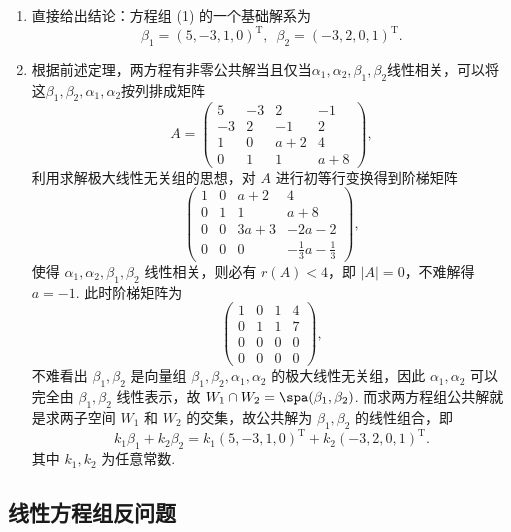 \begin{solution}
    \begin{enumerate}
        \item 直接给出结论：方程组 (1) 的一个基础解系为
              \[\beta_1=(5,-3,1,0)^{\mathrm{T}},\enspace\beta_2=(-3,2,0,1)^{\mathrm{T}}.\]

        \item 根据前述定理，两方程有非零公共解当且仅当$\alpha_1,\alpha_2,\beta_1,\beta_2$线性相关，可以将这$\beta_1,\beta_2,\alpha_1,\alpha_2$按列排成矩阵
              \[A = \begin{pmatrix}
                      5 & -3 & 2 & -1 \\ -3 & 2 & -1 & 2 \\ 1 & 0 & a+2 & 4 \\ 0 & 1 & 1 & a+8
                  \end{pmatrix},\]
              利用求解极大线性无关组的思想，对 $A$ 进行初等行变换得到阶梯矩阵
              \[\begin{pmatrix}
                      1 & 0 & a+2 & 4 \\ 0 & 1 & 1 & a+8 \\ 0 & 0 & 3a+3 & -2a-2 \\ 0 & 0 & 0 & -\frac{1}{3}a-\frac{1}{3}
                  \end{pmatrix},\]
              使得 $\alpha_1,\alpha_2,\beta_1,\beta_2$ 线性相关，则必有 $r(A) < 4$，即 $|A| = 0$，不难解得 $a = -1$. 此时阶梯矩阵为
              \[\begin{pmatrix}
                      1 & 0 & 1 & 4 \\ 0 & 1 & 1 & 7 \\ 0 & 0 & 0 & 0 \\ 0 & 0 & 0 & 0
                  \end{pmatrix},\]
              不难看出 $\beta_1,\beta_2$ 是向量组 $\beta_1,\beta_2,\alpha_1,\alpha_2$ 的极大线性无关组，因此 $\alpha_1,\alpha_2$ 可以完全由 $\beta_1,\beta_2$ 线性表示，故 $W_1 \cap W_2 = \spa(\beta_1,\beta_2)$. 而求两方程组公共解就是求两子空间 $W_1$ 和 $W_2$ 的交集，故公共解为 $\beta_1,\beta_2$ 的线性组合，即
              \[k_1\beta_1 + k_2\beta_2 = k_1(5,-3,1,0)^{\mathrm{T}} + k_2(-3,2,0,1)^{\mathrm{T}}.\]
              其中 $k_1,k_2$ 为任意常数.
    \end{enumerate}
\end{solution}

\subsection{线性方程组反问题}

